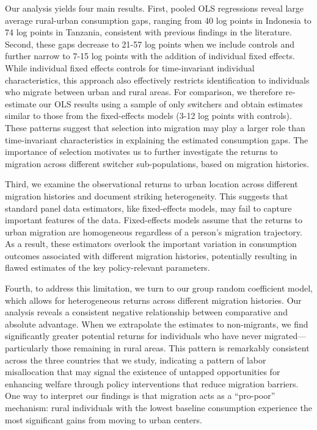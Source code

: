 Our analysis yields four main results. 
First, pooled OLS regressions reveal large average rural-urban consumption gaps, ranging from 40 log points in Indonesia to 74 log points in Tanzania, consistent with previous findings in the literature.
Second, these gaps decrease to 21-57 log points when we include controls and further narrow to 7-15 log points with the addition of individual fixed effects. 
While individual fixed effects controls for time-invariant individual characteristics, this approach also effectively restricts identification to individuals who migrate between urban and rural areas.
For comparison, we therefore re-estimate our OLS results using a sample of only switchers and obtain estimates similar to those from the fixed-effects models (3-12 log points with controls).
These patterns suggest that selection into migration may play a larger role than time-invariant characteristics in explaining the estimated consumption gaps.
The importance of selection motivates us to further investigate the returns to migration across different switcher sub-populations, based on migration histories.

Third, we examine the observational returns to urban location across different migration histories and document striking heterogeneity. 
This suggests that standard panel data estimators, like fixed-effects models, may fail to capture important features of the data.
Fixed-effects models assume that the returns to urban migration are homogeneous regardless of a person's migration trajectory.
As a result, these estimators overlook the important variation in consumption outcomes associated with different migration histories, potentially resulting in flawed estimates of the key policy-relevant parameters. 

Fourth, to address this limitation, we turn to our group random coefficient model, which allows for heterogeneous returns across different migration histories. 
Our analysis reveals a consistent negative relationship between comparative and absolute advantage.
When we extrapolate the estimates to non-migrants, we find significantly greater potential returns for individuals who have never migrated---particularly those remaining in rural areas. 
This pattern is remarkably consistent across the three countries that we study, indicating a pattern of labor misallocation that may signal the existence of untapped opportunities for enhancing welfare through policy interventions that reduce migration barriers.
One way to interpret our findings is that migration acts as a ``pro-poor'' mechanism: rural individuals with the lowest baseline consumption experience the most significant gains from moving to urban centers. 

